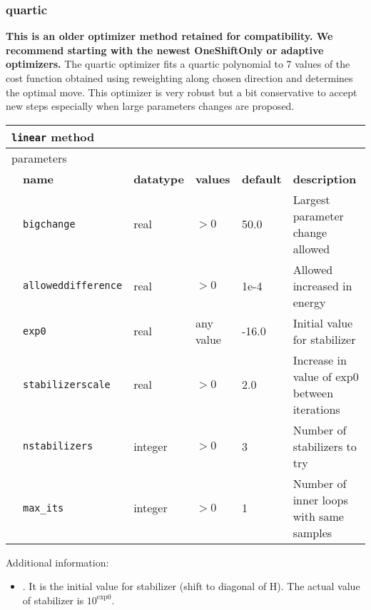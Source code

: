 \subsubsection{quartic}
\textbf{This is an older optimizer method retained for compatibility. We recommend starting with the newest OneShiftOnly or adaptive optimizers.}
The quartic optimizer fits a quartic polynomial to 7 values of the cost function obtained using reweighting along chosen direction and determines the optimal move.
This optimizer is very robust but a bit conservative to accept new steps especially when large parameters changes are proposed.
\begin{table}[h]
\begin{center}
\begin{tabularx}{\textwidth}{l l l l l l }
\hline
\multicolumn{6}{l}{\texttt{linear} method} \\
\hline
\multicolumn{2}{l}{parameters}  & \multicolumn{4}{l}{}\\
   &   \bfseries name     & \bfseries datatype & \bfseries values & \bfseries default   & \bfseries description \\
   &   \texttt{bigchange} &  real     & $>0$ & 50.0  & Largest parameter change allowed\\
   &   \texttt{alloweddifference} &  real     & $>0$ & 1e-4 & Allowed increased in energy\\
   &   \texttt{exp0} &  real     & any value & -16.0 & Initial value for stabilizer\\
   &   \texttt{stabilizerscale} &  real     & $>0$ & 2.0 & Increase in value of exp0 between iterations\\
   &   \texttt{nstabilizers} &  integer     & $>0$ & 3 & Number of stabilizers to try\\
   &   \texttt{max\_its} &  integer   & $>0$ & 1 & Number of inner loops with same samples\\
  \hline
\end{tabularx}
\end{center}
\end{table}

Additional information:
\begin{itemize}
\item {}. It is the initial value for stabilizer (shift to diagonal of H). The actual value of stabilizer is $10^{\textrm{exp0}}$.
\end{itemize}

